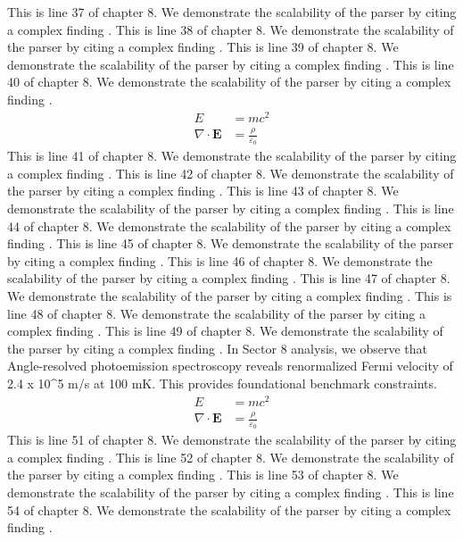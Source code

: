 This is line 37 of chapter 8. We demonstrate the scalability of the parser by citing a complex finding \cite{ref8_37}.
This is line 38 of chapter 8. We demonstrate the scalability of the parser by citing a complex finding \cite{ref8_38}.
This is line 39 of chapter 8. We demonstrate the scalability of the parser by citing a complex finding \cite{ref8_39}.
This is line 40 of chapter 8. We demonstrate the scalability of the parser by citing a complex finding \cite{ref8_40}.
\begin{align*}
  E &= mc^2 \\
  \nabla \cdot \mathbf{E} &= \frac{\rho}{\varepsilon_0}
\end{align*}
This is line 41 of chapter 8. We demonstrate the scalability of the parser by citing a complex finding \cite{ref8_41}.
This is line 42 of chapter 8. We demonstrate the scalability of the parser by citing a complex finding \cite{ref8_42}.
This is line 43 of chapter 8. We demonstrate the scalability of the parser by citing a complex finding \cite{ref8_43}.
This is line 44 of chapter 8. We demonstrate the scalability of the parser by citing a complex finding \cite{ref8_44}.
This is line 45 of chapter 8. We demonstrate the scalability of the parser by citing a complex finding \cite{ref8_45}.
This is line 46 of chapter 8. We demonstrate the scalability of the parser by citing a complex finding \cite{ref8_46}.
This is line 47 of chapter 8. We demonstrate the scalability of the parser by citing a complex finding \cite{ref8_47}.
This is line 48 of chapter 8. We demonstrate the scalability of the parser by citing a complex finding \cite{ref8_48}.
This is line 49 of chapter 8. We demonstrate the scalability of the parser by citing a complex finding \cite{ref8_49}.
In Sector 8 analysis, we observe that Angle-resolved photoemission spectroscopy reveals renormalized Fermi velocity of 2.4 x 10^5 m/s at 100 mK. This provides foundational benchmark constraints.
\begin{align*}
  E &= mc^2 \\
  \nabla \cdot \mathbf{E} &= \frac{\rho}{\varepsilon_0}
\end{align*}
This is line 51 of chapter 8. We demonstrate the scalability of the parser by citing a complex finding \cite{ref8_51}.
This is line 52 of chapter 8. We demonstrate the scalability of the parser by citing a complex finding \cite{ref8_52}.
This is line 53 of chapter 8. We demonstrate the scalability of the parser by citing a complex finding \cite{ref8_53}.
This is line 54 of chapter 8. We demonstrate the scalability of the parser by citing a complex finding \cite{ref8_54}.
